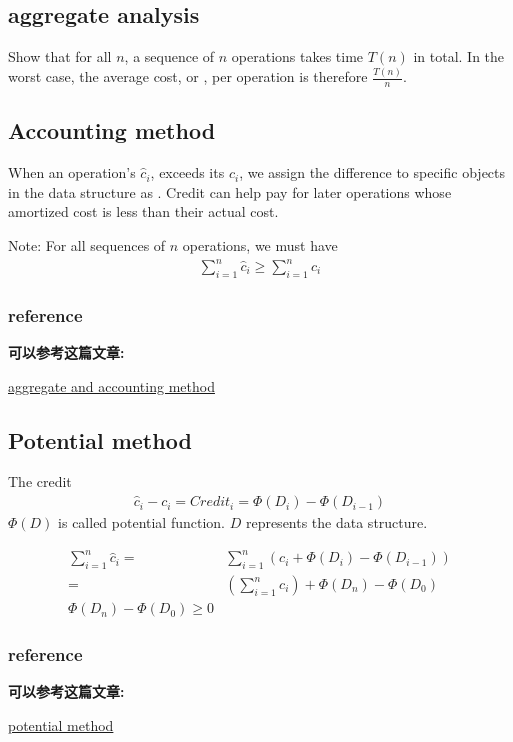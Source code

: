 \documentclass{article}
\begin{document}
\subsection{aggregate analysis}
Show that for all $n$, a sequence of $n$ operations takes {\color{red}{worst-case}} time $T(n)$ in total. In the worst case, the average cost, or {\color{red}{amortized cost}}, per operation is therefore $\frac{T(n)}{n}$. 

\subsection{Accounting method}
When an operation's {\color{red}{amortized cost}} $\hat{c}_i$, exceeds its {\color{red}{actual cost}} $c_i$, we assign the difference to specific objects in the data structure as {\color{red}{credit}}. Credit can help pay for later operations whose amortized cost is less than their actual cost. 

Note: For all sequences of $n$ operations, we must have
\begin{align*}
    \sum_{i=1}^n\hat{c}_i\ge \sum_{i=1}^n c_i
\end{align*}

\subsubsection{reference}
\textbf{可以参考这篇文章:}\par
\href{https://www.baeldung.com/cs/amortized-analysis}{aggregate and accounting method}

\subsection{Potential method}

The credit 
\begin{align*}
    \hat{c}_i-c_i=Credit_i=\Phi(D_i)-\Phi(D_{i-1})
\end{align*}
$\Phi(D)$ is called potential function. $D$ represents the data structure. 

\begin{align*}
    \sum_{i=1}^n\hat{c}_i=&\sum_{i=1}^n \left(  c_i +\Phi(D_i)-\Phi(D_{i-1}) \right)\\
    =&\left(\sum_{i=1}^n c_i\right) + \Phi(D_n)-\Phi(D_0)\\
    \Phi(D_n)-\Phi(D_0) \ge 0
\end{align*}


\subsubsection{reference}
\textbf{可以参考这篇文章:}\par
\href{https://www.yuque.com/xianyuxuan/saltfish_shop/weekly002_amortized_analysis#KmnY6}{potential method}
\end{document}
